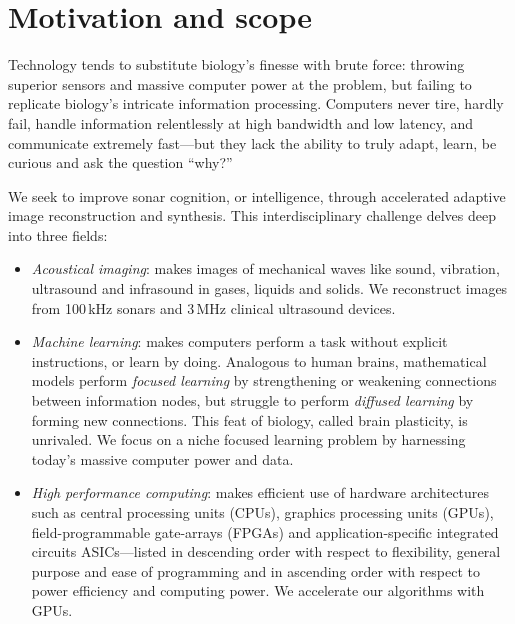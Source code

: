 \section{Motivation and scope}

Technology tends to substitute biology's finesse with brute force: throwing superior sensors and massive computer power at the problem, but failing to replicate biology's intricate information processing. Computers never tire, hardly fail, handle information relentlessly at high bandwidth and low latency, and communicate extremely fast---but they lack the ability to truly adapt, learn, be curious and ask the question ``why?''


We seek to improve sonar cognition, or intelligence, through accelerated adaptive image reconstruction and synthesis. This  interdisciplinary challenge delves deep into three fields:%
%
\begin{itemize}
%
\item \emph{Acoustical imaging}: makes images of mechanical waves like sound, vibration, ultrasound and infrasound in gases, liquids and solids. We reconstruct images from 100\,kHz sonars and 3\,MHz clinical ultrasound devices. 
%
\item \emph{Machine learning}: makes computers perform a task without explicit instructions, or learn by doing. Analogous to human brains, mathematical models perform \emph{focused learning} by strengthening or weakening connections between information nodes, but struggle to perform \emph{diffused learning} by forming new connections. This feat of biology, called brain plasticity, is unrivaled. We focus on a niche focused learning problem by harnessing today's massive computer power and data.
%
\item \emph{High performance computing}: makes efficient use of hardware architectures such as central processing units (CPUs), graphics processing units (GPUs), field-programmable gate-arrays (FPGAs) and application-specific integrated circuits ASICs---listed in descending order with respect to flexibility, general purpose and ease of programming and in ascending order with respect to power efficiency and computing power. We accelerate our algorithms with GPUs.
\end{itemize}


